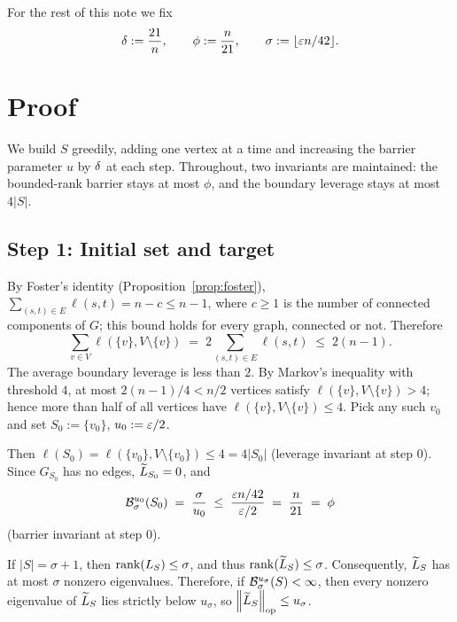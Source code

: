 For the rest of this note we fix
\[
  \delta := \frac{21}{n}, \qquad
  \phi := \frac{n}{21}, \qquad
  \sigma := \lfloor \varepsilon n/42 \rfloor.
\]

\section*{Proof}

We build $S$ greedily, adding one vertex at a time and increasing the barrier
parameter $u$ by $\delta$ at each step. Throughout, two invariants are
maintained: the bounded-rank barrier stays at most $\phi$, and the boundary
leverage stays at most $4|S|$.

\subsection*{Step 1: Initial set and target}

By Foster's identity (Proposition~\ref{prop:foster}),
$\sum_{(s,t)\in E}\ell(s,t)=n-c\le n-1$, where $c\ge1$ is the number of connected
components of $G$; this bound holds for every graph, connected or not. Therefore
\[
  \sum_{v\in V}\ell(\{v\},V\setminus\{v\})
   \;=\; 2\!\sum_{(s,t)\in E}\ell(s,t)
   \;\le\; 2(n-1).
\]
The average boundary leverage is less than $2$. By Markov's inequality with
threshold $4$, at most $2(n-1)/4 < n/2$ vertices satisfy
$\ell(\{v\},V\setminus\{v\})>4$; hence more than half of all vertices have
$\ell(\{v\},V\setminus\{v\})\le 4$. Pick any such $v_0$ and set
$S_0:=\{v_0\}$, $u_0:=\varepsilon/2$.

Then $\ell(S_0)=\ell(\{v_0\},V\setminus\{v_0\})\le 4=4|S_0|$
(leverage invariant at step $0$).
Since $G_{S_0}$ has no edges, $\widetilde{L}_{S_0}=0$, and
\[
  \mathcal{B}^{u_0}_{\sigma}(S_0) \;=\; \frac{\sigma}{u_0}
   \;\le\; \frac{\varepsilon n/42}{\varepsilon/2} \;=\; \frac{n}{21} \;=\; \phi
\]
(barrier invariant at step $0$).

\begin{qsixclaim}\label{cl:rank-barrier}
If $|S|=\sigma+1$, then $\operatorname{rank}(L_S) \le \sigma$, and thus $\operatorname{rank}(\widetilde{L}_S) \le \sigma$.
Consequently, $\widetilde{L}_S$ has at most $\sigma$ nonzero eigenvalues. Therefore, if
$\mathcal{B}^{u_\sigma}_{\sigma}(S)<\infty$, then every nonzero eigenvalue of $\widetilde{L}_S$
lies strictly below $u_\sigma$, so $\left\lVert \widetilde{L}_S \right\rVert_{\mathrm{op}}\le u_\sigma$.
\end{qsixclaim}

